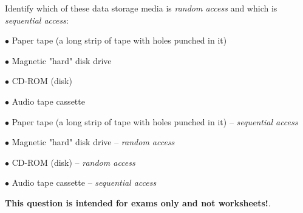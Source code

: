 

Identify which of these data storage media is {\it random access} and which is {\it sequential access}:

\medskip
\item{$\bullet$} Paper tape (a long strip of tape with holes punched in it)
\item{$\bullet$} Magnetic "hard" disk drive
\item{$\bullet$} CD-ROM (disk)
\item{$\bullet$} Audio tape cassette
\medskip







\medskip
\item{$\bullet$} Paper tape (a long strip of tape with holes punched in it) -- {\it sequential access}
\item{$\bullet$} Magnetic "hard" disk drive -- {\it random access}
\item{$\bullet$} CD-ROM (disk) -- {\it random access}
\item{$\bullet$} Audio tape cassette -- {\it sequential access}
\medskip







{\bf This question is intended for exams only and not worksheets!}.





